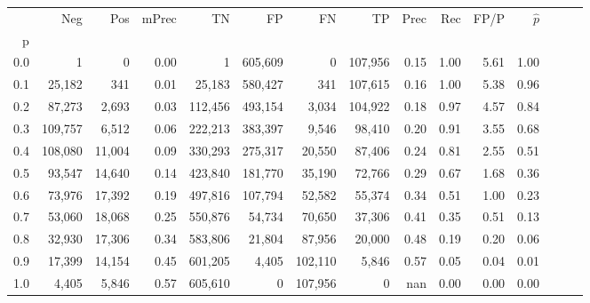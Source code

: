 \begin{tabular}{rrrrrrrrrrrrrrr}
\toprule
{} &      Neg &     Pos & mPrec &       TN &       FP &       FN &       TP &  Prec &   Rec &  FP/P & $\hat{p}$ \\
p   &          &         &       &          &          &          &          &       &       &       &           \\
\midrule
0.0 &        1 &       0 &  0.00 &        1 &  605,609 &        0 &  107,956 &  0.15 &  1.00 &  5.61 &      1.00 \\
0.1 &   25,182 &     341 &  0.01 &   25,183 &  580,427 &      341 &  107,615 &  0.16 &  1.00 &  5.38 &      0.96 \\
0.2 &   87,273 &   2,693 &  0.03 &  112,456 &  493,154 &    3,034 &  104,922 &  0.18 &  0.97 &  4.57 &      0.84 \\
0.3 &  109,757 &   6,512 &  0.06 &  222,213 &  383,397 &    9,546 &   98,410 &  0.20 &  0.91 &  3.55 &      0.68 \\
0.4 &  108,080 &  11,004 &  0.09 &  330,293 &  275,317 &   20,550 &   87,406 &  0.24 &  0.81 &  2.55 &      0.51 \\
0.5 &   93,547 &  14,640 &  0.14 &  423,840 &  181,770 &   35,190 &   72,766 &  0.29 &  0.67 &  1.68 &      0.36 \\
0.6 &   73,976 &  17,392 &  0.19 &  497,816 &  107,794 &   52,582 &   55,374 &  0.34 &  0.51 &  1.00 &      0.23 \\
0.7 &   53,060 &  18,068 &  0.25 &  550,876 &   54,734 &   70,650 &   37,306 &  0.41 &  0.35 &  0.51 &      0.13 \\
0.8 &   32,930 &  17,306 &  0.34 &  583,806 &   21,804 &   87,956 &   20,000 &  0.48 &  0.19 &  0.20 &      0.06 \\
0.9 &   17,399 &  14,154 &  0.45 &  601,205 &    4,405 &  102,110 &    5,846 &  0.57 &  0.05 &  0.04 &      0.01 \\
1.0 &    4,405 &   5,846 &  0.57 &  605,610 &        0 &  107,956 &        0 &   nan &  0.00 &  0.00 &      0.00 \\
\bottomrule
\end{tabular}
